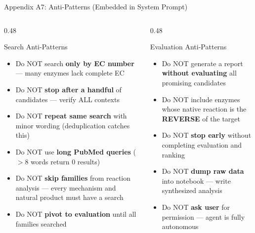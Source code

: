 \documentclass[aspectratio=169, 11pt]{beamer}
\begin{document}
\begin{frame}{Appendix A7: Anti-Patterns (Embedded in System Prompt)}
\vspace{-8pt}
\begin{columns}[T]
\begin{column}{0.48\textwidth}
\begin{alertblock}{\small Search Anti-Patterns}
\vspace{-2pt}
\begin{itemize}\scriptsize
\setlength\itemsep{1pt}
\item Do NOT search \textbf{only by EC number} --- many enzymes lack complete EC
\item Do NOT \textbf{stop after a handful} of candidates --- verify ALL contexts
\item Do NOT \textbf{repeat same search} with minor wording (deduplication catches this)
\item Do NOT use \textbf{long PubMed queries} ($>$8 words return 0 results)
\item Do NOT \textbf{skip families} from reaction analysis --- every mechanism and natural product must have a search
\item Do NOT \textbf{pivot to evaluation} until all families searched
\end{itemize}
\end{alertblock}
\end{column}
\begin{column}{0.48\textwidth}
\begin{block}{\small Evaluation Anti-Patterns}
\vspace{-2pt}
\begin{itemize}\scriptsize
\setlength\itemsep{1pt}
\item Do NOT generate a report \textbf{without evaluating} all promising candidates
\item Do NOT include enzymes whose native reaction is the \textbf{REVERSE} of the target
\item Do NOT \textbf{stop early} without completing evaluation and ranking
\item Do NOT \textbf{dump raw data} into notebook --- write synthesized analysis
\item Do NOT \textbf{ask user} for permission --- agent is fully autonomous
\end{itemize}
\end{block}


\end{column}
\end{columns}
\end{frame}
\end{document}
